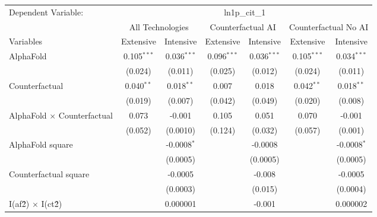 \begingroup
\centering
\begin{tabular}{lcccccc}
   \tabularnewline \midrule \midrule
   Dependent Variable: & \multicolumn{6}{c}{ln1p\_cit\_1}\\
 & \multicolumn{2}{c}{All Technologies} & \multicolumn{2}{c}{Counterfactual AI} & \multicolumn{2}{c}{Counterfactual No AI} \\
\cmidrule(lr){1-1}\cmidrule(lr){2-3} \cmidrule(lr){4-5} \cmidrule(lr){6-7}
Variables & \multicolumn{1}{c}{Extensive} & \multicolumn{1}{c}{Intensive} & \multicolumn{1}{c}{Extensive} & \multicolumn{1}{c}{Intensive} & \multicolumn{1}{c}{Extensive} & \multicolumn{1}{c}{Intensive} \\
\cmidrule(lr){1-1}\cmidrule(lr){2-2} \cmidrule(lr){3-3} \cmidrule(lr){4-4} \cmidrule(lr){5-5} \cmidrule(lr){6-6} \cmidrule(lr){7-7}
   AlphaFold                          & 0.105$^{***}$ & 0.036$^{***}$ & 0.096$^{***}$ & 0.036$^{***}$ & 0.105$^{***}$ & 0.034$^{***}$\\   
                                      & (0.024)       & (0.011)       & (0.025)       & (0.012)       & (0.024)       & (0.011)\\   
   Counterfactual                     & 0.040$^{**}$  & 0.018$^{**}$  & 0.007         & 0.018         & 0.042$^{**}$  & 0.018$^{**}$\\   
                                      & (0.019)       & (0.007)       & (0.042)       & (0.049)       & (0.020)       & (0.008)\\   
   AlphaFold $\times$ Counterfactual  & 0.073         & -0.001        & 0.105         & 0.051         & 0.070         & -0.001\\   
                                      & (0.052)       & (0.0010)      & (0.124)       & (0.032)       & (0.057)       & (0.001)\\   
   AlphaFold square                   &               & -0.0008$^{*}$ &               & -0.0008       &               & -0.0008$^{*}$\\   
                                      &               & (0.0005)      &               & (0.0005)      &               & (0.0005)\\   
   Counterfactual square              &               & -0.0005       &               & -0.008        &               & -0.0005\\   
                                      &               & (0.0003)      &               & (0.015)       &               & (0.0004)\\   
   I(af\^2) $\times$ I(ct\^2)         &               & 0.000001      &               & -0.001        &               & 0.000002\\   

\end{tabular}
